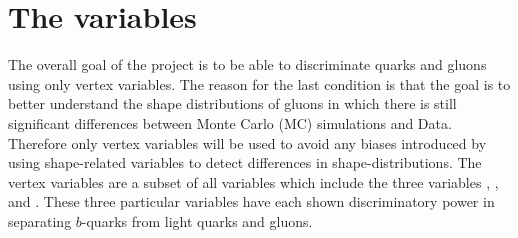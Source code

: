 \section{The variables}
The overall goal of the project is to be able to discriminate quarks and gluons using only vertex variables. The reason for the last condition is that the goal is to better understand the shape distributions of gluons in which there is still significant differences between Monte Carlo (MC) simulations and Data. Therefore only vertex variables will be used to avoid any biases introduced by using shape-related variables to detect differences in shape-distributions. 
The vertex variables are a subset of all variables which include the three variables , , and . These three particular variables have each shown discriminatory power in separating $b$-quarks from light quarks and gluons. 

